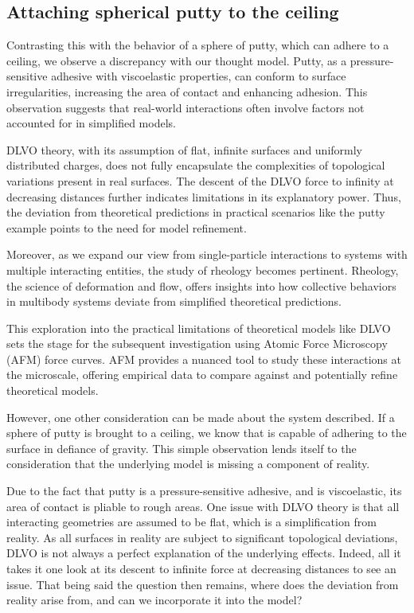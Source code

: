 \subsection{Attaching spherical putty to the ceiling}

Contrasting this with the behavior of a sphere of putty, which can adhere to a ceiling, we observe a discrepancy with our thought model. Putty, as a pressure-sensitive adhesive with viscoelastic properties, can conform to surface irregularities, increasing the area of contact and enhancing adhesion. This observation suggests that real-world interactions often involve factors not accounted for in simplified models.

DLVO theory, with its assumption of flat, infinite surfaces and uniformly distributed charges, does not fully encapsulate the complexities of topological variations present in real surfaces. The descent of the DLVO force to infinity at decreasing distances further indicates limitations in its explanatory power. Thus, the deviation from theoretical predictions in practical scenarios like the putty example points to the need for model refinement.

Moreover, as we expand our view from single-particle interactions to systems with multiple interacting entities, the study of rheology becomes pertinent. Rheology, the science of deformation and flow, offers insights into how collective behaviors in multibody systems deviate from simplified theoretical predictions.

This exploration into the practical limitations of theoretical models like DLVO sets the stage for the subsequent investigation using Atomic Force Microscopy (AFM) force curves. AFM provides a nuanced tool to study these interactions at the microscale, offering empirical data to compare against and potentially refine theoretical models.

However, one other consideration can be made about the system described. If a sphere of putty is brought to a ceiling, we know that is capable of adhering to the surface in defiance of gravity. This simple observation lends itself to the consideration that the underlying model is missing a component of reality.

Due to the fact that putty is a pressure-sensitive adhesive, and is viscoelastic, its area of contact is pliable to rough areas. One issue with DLVO theory is that all interacting geometries are assumed to be flat, which is a simplification from reality. As all surfaces in reality are subject to significant topological deviations, DLVO is not always a perfect explanation of the underlying effects. Indeed, all it takes it one look at its descent to infinite force at decreasing distances to see an issue. That being said the question then remains, where does the deviation from reality arise from, and can we incorporate it into the model?

